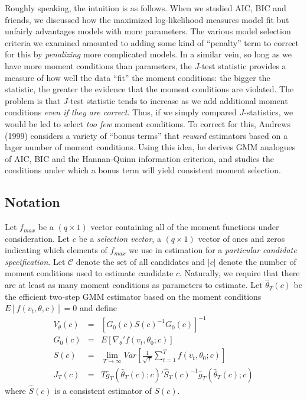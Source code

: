 Roughly speaking, the intuition is as follows. When we studied AIC, BIC and friends, we discussed how the maximized log-likelihood measures model fit but unfairly advantages models with more parameters. The various model selection criteria we examined amounted to adding some kind of ``penalty'' term to correct for this by \emph{penalizing} more complicated models. In a similar vein, so long as we have more moment conditions than parameters, the $J$-test statistic provides a measure of how well the data ``fit'' the moment conditions: the bigger the statistic, the greater the evidence that the moment conditions are violated. The problem is that $J$-test statistic tends to increase as we add additional moment conditions \emph{even if they are correct}. Thus, if we simply compared $J$-statistics, we would be led to select \emph{too few} moment conditions. To correct for this, Andrews (1999) considers a variety of ``bonus terms'' that \emph{reward} estimators based on a lager number of moment conditions. Using this idea, he derives GMM analogues of AIC, BIC and the Hannan-Quinn information criterion, and studies the conditions under which a bonus term will yield consistent moment selection.

\subsection{Notation}
Let $f_{max}$ be a $(q\times 1)$ vector containing all of the moment functions under consideration. Let $c$ be a \emph{selection vector}, a $(q\times 1)$ vector of ones and zeros indicating which elements of $f_{max}$ we use in estimation for a \emph{particular candidate specification}. Let $\mathcal{C}$ denote the set of all candidates and $|c|$ denote the number of moment conditions used to estimate candidate $c$. Naturally, we require that there are at least as many moment conditions as parameters to estimate. Let $\widehat{\theta}_T(c)$ be the efficient two-step GMM estimator based on the moment conditions $E[f(v_t,\theta, c)]=0$ and define
\begin{eqnarray*}
 	V_\theta(c) &=& \left[G_0(c) S(c)^{-1} G_0(c) \right]^{-1}\\
 	G_0(c) &=& E[\nabla_\theta' f(v_t, \theta_0; c)]\\
 	S(c) &=& \lim_{T\rightarrow\infty} Var\left[\frac{1}{\sqrt{T}}\sum_{t=1}^T f(v_t, \theta_0;c)\right]\\
 	J_T(c) &=& T \bar{g}_T\left(\widehat{\theta}_T(c);c\right)'\widehat{S}_T(c)^{-1}\bar{g}_T\left(\widehat{\theta}_T(c);c\right)
 \end{eqnarray*}
where $\widehat{S}(c)$ is a consistent estimator of $S(c)$.

